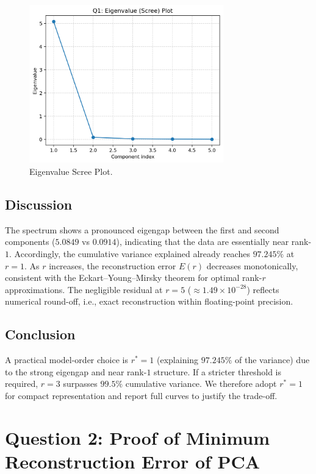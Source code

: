 \documentclass[12pt,a4paper]{article}
\begin{document}
\begin{figure}[H]
    \centering
    \includegraphics[width=0.75\textwidth]{outputs/q1/q1_scree.png}
    \caption{Eigenvalue Scree Plot.}
    \label{fig:q1_scree}
\end{figure}

\subsection{Discussion}
The spectrum shows a pronounced eigengap between the first and second components ($5.0849$ vs $0.0914$), indicating that the data are essentially near rank-$1$. 
Accordingly, the cumulative variance explained already reaches $97.245\%$ at $r=1$. 
As $r$ increases, the reconstruction error $E(r)$ decreases monotonically, consistent with the Eckart–Young–Mirsky theorem for optimal rank-$r$ approximations. 
The negligible residual at $r=5$ ($\approx 1.49\times10^{-28}$) reflects numerical round-off, i.e., exact reconstruction within floating-point precision.

\subsection{Conclusion}\label{sec:q1_conclusion}
A practical model-order choice is $r^\ast=1$ (explaining $97.245\%$ of the variance) due to the strong eigengap and near rank-$1$ structure. 
If a stricter threshold is required, $r=3$ surpasses $99.5\%$ cumulative variance. 
We therefore adopt $r^\ast=1$ for compact representation and report full curves to justify the trade-off.

\newpage
\section{Question 2: Proof of Minimum Reconstruction Error of PCA}
\end{document}
